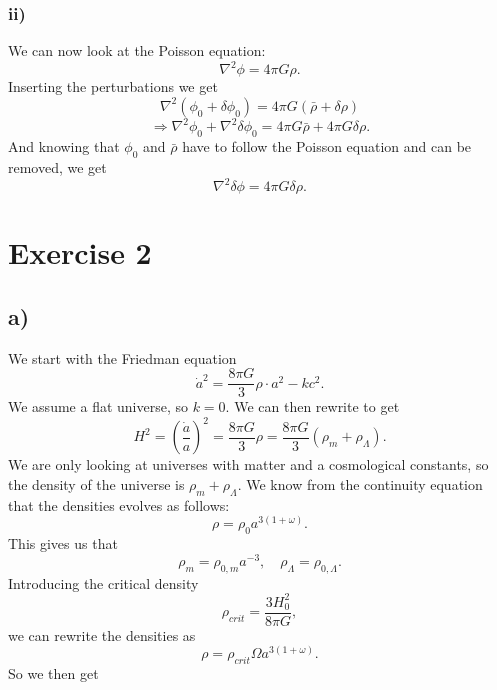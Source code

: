 \documentclass[a4paper,norsk, 10pt]{article}
\begin{document}
\subsubsection{ii)}
We can now look at the Poisson equation:
\begin{equation}
\nabla^2 \phi = 4\pi G\rho.
\end{equation}
Inserting the perturbations we get
\begin{equation}
\nabla^2 (\phi_0 + \delta \phi_0) = 4\pi G(\bar{\rho} + \delta \rho)
\end{equation}
\begin{equation}
\Rightarrow \nabla^2 \phi_0 + \nabla^2\delta \phi_0 = 4\pi G\bar{\rho} + 4\pi G\delta \rho.
\end{equation}
And knowing that $\phi_0$ and $\bar{\rho}$ have to follow the Poisson equation and can be removed, we get
\begin{equation}
\nabla^2 \delta\phi = 4\pi G \delta\rho.
\end{equation}



\section{Exercise 2}
\subsection{a)}
We start with the Friedman equation
\begin{equation}
\dot{a}^2 = \frac{8\pi G}{3}\rho\cdot a^2 -kc^2.
\end{equation}
We assume a flat universe, so $k=0$. We can then rewrite to get
\begin{equation}
H^2 = \left(\frac{\dot{a}}{a}\right)^2 =  \frac{8\pi G}{3}\rho =  \frac{8\pi G}{3}\left(\rho_{m}+\rho_{\Lambda}\right).
\end{equation}
We are only looking at universes with matter and a cosmological constants, so the density of the universe is $\rho_{m}+\rho_{\Lambda}$. We know from the continuity equation that the densities evolves as follows:
\begin{equation}
\rho = \rho_{0}a^{3(1+\omega)}.
\end{equation}
This gives us that
\begin{equation}
\rho_{m} = \rho_{0,m}a^{-3}, \quad \rho_{\Lambda} = \rho_{0,\Lambda}. 
\end{equation}
Introducing the critical density
\begin{equation}
\rho_{crit} = \frac{3H_{0}^2}{8\pi G},
\end{equation}
we can rewrite the densities as
\begin{equation}
\rho = \rho_{crit}\Omega a^{3(1+\omega)}.
\end{equation}
So we then get
\end{document}
